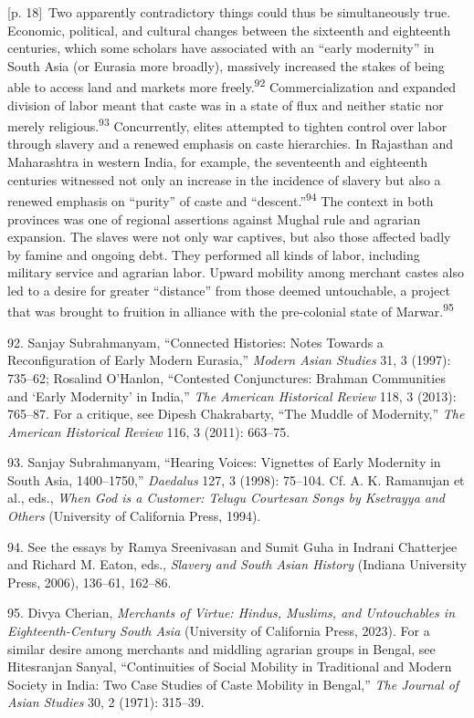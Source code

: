 \documentclass[10pt,a4paper]{article}
\begin{document}
{\scriptsize\color{gray} [p. 18]}\ Two apparently contradictory things could thus be simultaneously true. Economic, political, and cultural changes between the sixteenth and eighteenth centuries, which some scholars have associated with an “early modernity” in South Asia (or Eurasia more broadly), massively increased the stakes of being able to access land and markets more freely.\nobreak\textsuperscript{92} Commercialization and expanded division of labor meant that caste was in a state of flux and neither static nor merely religious.\nobreak\textsuperscript{93} Concurrently, elites attempted to tighten control over labor through slavery and a renewed emphasis on caste hierarchies. In Rajasthan and Maharashtra in western India, for example, the seventeenth and eighteenth centuries witnessed not only an increase in the incidence of slavery but also a renewed emphasis on “purity” of caste and “descent.”\nobreak\textsuperscript{94} The context in both provinces was one of regional assertions against Mughal rule and agrarian expansion. The slaves were not only war captives, but also those affected badly by famine and ongoing debt. They performed all kinds of labor, including military service and agrarian labor. Upward mobility among merchant castes also led to a desire for greater “distance” from those deemed untouchable, a project that was brought to fruition in alliance with the pre-colonial state of Marwar.\nobreak\textsuperscript{95}\par{\small 92. Sanjay Subrahmanyam, “Connected Histories: Notes Towards a Reconfiguration of Early Modern Eurasia,” \textit{Modern Asian Studies} 31, 3 (1997): 735–62; Rosalind O’Hanlon, “Contested Conjunctures: Brahman Communities and ‘Early Modernity’ in India,” \textit{The American Historical Review} 118, 3 (2013): 765–87. For a critique, see Dipesh Chakrabarty, “The Muddle of Modernity,” \textit{The American Historical Review} 116, 3 (2011): 663–75.\par}{\small 93. Sanjay Subrahmanyam, “Hearing Voices: Vignettes of Early Modernity in South Asia, 1400–1750,” \textit{Daedalus} 127, 3 (1998): 75–104. Cf. A. K. Ramanujan et al., eds., \textit{When God is a Customer: Telugu Courtesan Songs by Ksetrayya and Others} (University of California Press, 1994).\par}{\small 94. See the essays by Ramya Sreenivasan and Sumit Guha in Indrani Chatterjee and Richard M. Eaton, eds., \textit{Slavery and South Asian History} (Indiana University Press, 2006), 136–61, 162–86.\par}{\small 95. Divya Cherian, \textit{Merchants of Virtue: Hindus, Muslims, and Untouchables in Eighteenth-Century South Asia} (University of California Press, 2023). For a similar desire among merchants and middling agrarian groups in Bengal, see Hitesranjan Sanyal, “Continuities of Social Mobility in Traditional and Modern Society in India: Two Case Studies of Caste Mobility in Bengal,” \textit{The Journal of Asian Studies} 30, 2 (1971): 315–39.\par}
\end{document}
